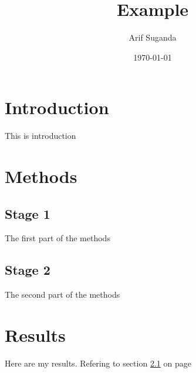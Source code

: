\documentclass[a4paper,12pt]{article}
\title{Example}
\author{Arif Suganda}
\date{\today}
\begin{document}
\maketitle
{}
\tableofcontents
\newpage
{}

\section{Introduction}
This is introduction

\section{Methods}
\subsection{Stage 1}
\label{sec1}
The first part of the methods

\subsection{Stage 2}
The second part of the methods

\section{Results}
Here are my results. Refering to section \ref{sec1} on page \pageref{sec1}
\end{document}
